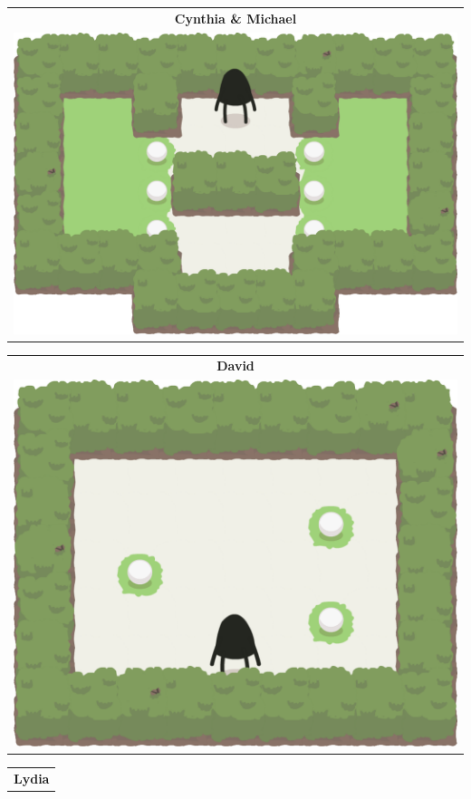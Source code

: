 \documentclass{report}
\theoremstyle{plain}
\begin{document}
\begin{center}
\begin{tabular}{c}
\end{tabular}
\begin{tabular}{c}
\textbf{Cynthia \& Michael} \\
\includegraphics[scale=\levelAnnexWidth]{cynthia-michael-1.png}
\end{tabular}
\begin{tabular}{c}
\textbf{David} \\
\includegraphics[scale=\levelAnnexWidth]{david-1.png}
\end{tabular}
\begin{tabular}{c}
\textbf{Lydia} \\

\end{tabular}
\end{center}
\end{document}
